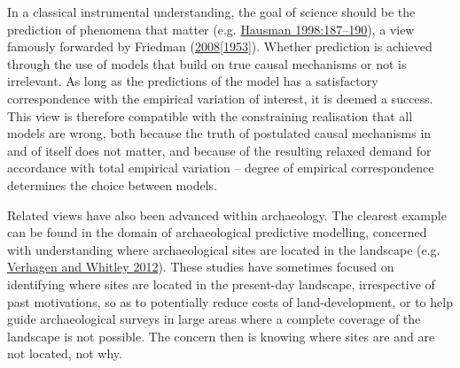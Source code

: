 \documentclass[
  12pt,
  a4paper,
  oneside]{book}
\begin{document}
In a classical instrumental understanding, the goal of science should be the prediction of phenomena that matter (e.g. \protect\hyperlink{ref-hausman1998}{Hausman 1998:187--190}), a view famously forwarded by Friedman (\protect\hyperlink{ref-friedman1953}{2008{[}1953{]}}). Whether prediction is achieved through the use of models that build on true causal mechanisms or not is irrelevant. As long as the predictions of the model has a satisfactory correspondence with the empirical variation of interest, it is deemed a success. This view is therefore compatible with the constraining realisation that all models are wrong, both because the truth of postulated causal mechanisms in and of itself does not matter, and because of the resulting relaxed demand for accordance with total empirical variation -- degree of empirical correspondence determines the choice between models.

Related views have also been advanced within archaeology. The clearest example can be found in the domain of archaeological \textquotesingle predictive\textquotesingle{} modelling, concerned with understanding where archaeological sites are located in the landscape (e.g. \protect\hyperlink{ref-verhagen2012}{Verhagen and Whitley 2012}). These studies have sometimes focused on identifying where sites are located in the present-day landscape, irrespective of past motivations, so as to potentially reduce costs of land-development, or to help guide archaeological surveys in large areas where a complete coverage of the landscape is not possible. The concern then is knowing where sites are and are not located, not why.
\end{document}
